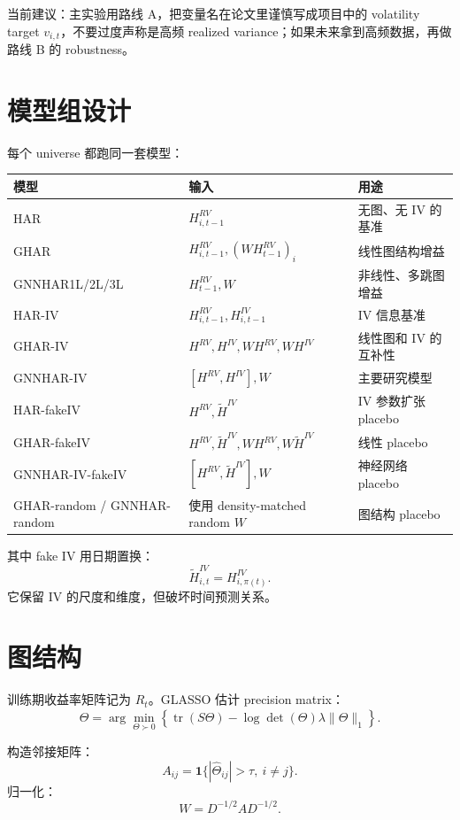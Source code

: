 \documentclass[11pt,a4paper]{ctexart}
\begin{document}
当前建议：主实验用路线 A，把变量名在论文里谨慎写成项目中的 volatility target \(v_{i,t}\)，不要过度声称是高频 realized variance；如果未来拿到高频数据，再做路线 B 的 robustness。

\section{模型组设计}

每个 universe 都跑同一套模型：

\begin{longtable}{lll}
\toprule
模型 & 输入 & 用途 \\
\midrule
\endhead
HAR & \(H^{RV}_{i,t-1}\) & 无图、无 IV 的基准 \\
GHAR & \(H^{RV}_{i,t-1}, (WH^{RV}_{t-1})_i\) & 线性图结构增益 \\
GNNHAR1L/2L/3L & \(H^{RV}_{t-1}, W\) & 非线性、多跳图增益 \\
HAR-IV & \(H^{RV}_{i,t-1}, H^{IV}_{i,t-1}\) & IV 信息基准 \\
GHAR-IV & \(H^{RV}, H^{IV}, WH^{RV}, WH^{IV}\) & 线性图和 IV 的互补性 \\
GNNHAR-IV & \([H^{RV},H^{IV}], W\) & 主要研究模型 \\
HAR-fakeIV & \(H^{RV}, \widetilde H^{IV}\) & IV 参数扩张 placebo \\
GHAR-fakeIV & \(H^{RV}, \widetilde H^{IV}, WH^{RV}, W\widetilde H^{IV}\) & 线性 placebo \\
GNNHAR-IV-fakeIV & \([H^{RV},\widetilde H^{IV}], W\) & 神经网络 placebo \\
GHAR-random / GNNHAR-random & 使用 density-matched random \(W\) & 图结构 placebo \\
\bottomrule
\end{longtable}

其中 fake IV 用日期置换：
\[
\widetilde H^{IV}_{i,t}=H^{IV}_{i,\pi(t)}.
\]
它保留 IV 的尺度和维度，但破坏时间预测关系。

\section{图结构}

训练期收益率矩阵记为 \(R_t\)。GLASSO 估计 precision matrix：
\[
\widehat \Theta
=
\arg\min_{\Theta\succ0}
\left\{
\operatorname{tr}(S\Theta)-\log\det(\Theta)
\lambda\|\Theta\|_1
\right\}.
\]

构造邻接矩阵：
\[
A_{ij}=\mathbf{1}\{|\widehat\Theta_{ij}|>\tau,\ i\ne j\}.
\]
归一化：
\[
W=D^{-1/2}AD^{-1/2}.
\]
\end{document}
